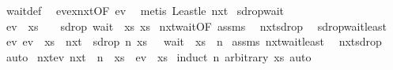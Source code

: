 \begin{isabellebody}
%
\isadelimproof
%
\endisadelimproof
%
\isatagproof
{}\isamarkupfalse%
\ wait{\isacharunderscore}def\ \isamarkupfalse%
\ ev{\isacharunderscore}ex{\isacharunderscore}nxt{\isacharbrackleft}OF\ ev{\isacharbrackright}\ \isamarkupfalse%
\ {\isacharparenleft}metis\ Least{\isacharunderscore}le\ nxt{\isacharparenright}%
\endisatagproof
{\isafoldproof}%
%
\isadelimproof
\isanewline
%
\endisadelimproof
\isanewline
{}\isamarkupfalse%
\ sdrop{\isacharunderscore}wait{\isacharcolon}\isanewline
{}\ {\isachardoublequoteopen}ev\ {\isasymphi}\ xs{\isachardoublequoteclose}\ \ \ {\isachardoublequoteopen}{\isasymphi}\ {\isacharparenleft}sdrop\ {\isacharparenleft}wait\ {\isasymphi}\ xs{\isacharparenright}\ xs{\isacharparenright}{\isachardoublequoteclose}\isanewline
%
\isadelimproof
%
\endisadelimproof
%
\isatagproof
{}\isamarkupfalse%
\ nxt{\isacharunderscore}wait{\isacharbrackleft}OF\ assms{\isacharbrackright}\ \isamarkupfalse%
\ nxt{\isacharunderscore}sdrop\ \isacommand{{\isachardot}}\isamarkupfalse%
%
\endisatagproof
{\isafoldproof}%
%
\isadelimproof
\isanewline
%
\endisadelimproof
\isanewline
{}\isamarkupfalse%
\ sdrop{\isacharunderscore}wait{\isacharunderscore}least{\isacharcolon}\isanewline
{}\ ev{\isacharcolon}\ {\isachardoublequoteopen}ev\ {\isasymphi}\ xs{\isachardoublequoteclose}\ \ nxt{\isacharcolon}\ {\isachardoublequoteopen}{\isasymphi}\ {\isacharparenleft}sdrop\ n\ xs{\isacharparenright}{\isachardoublequoteclose}\ \ \ {\isachardoublequoteopen}wait\ {\isasymphi}\ xs\ {\isasymle}\ n{\isachardoublequoteclose}\isanewline
%
\isadelimproof
%
\endisadelimproof
%
\isatagproof
{}\isamarkupfalse%
\ assms\ nxt{\isacharunderscore}wait{\isacharunderscore}least\ \isamarkupfalse%
\ nxt{\isacharunderscore}sdrop\ \isamarkupfalse%
\ auto%
\endisatagproof
{\isafoldproof}%
%
\isadelimproof
\isanewline
%
\endisadelimproof
\isanewline
{}\isamarkupfalse%
\ nxt{\isacharunderscore}ev{\isacharcolon}\ {\isachardoublequoteopen}{\isacharparenleft}nxt\ {\isacharcircum}{\isacharcircum}\ n{\isacharparenright}\ {\isasymphi}\ xs\ {\isasymLongrightarrow}\ ev\ {\isasymphi}\ xs{\isachardoublequoteclose}\isanewline
%
\isadelimproof
%
\endisadelimproof
%
\isatagproof
{}\isamarkupfalse%
\ {\isacharparenleft}induct\ n\ arbitrary{\isacharcolon}\ xs{\isacharparenright}\ auto%
\endisatagproof
{\isafoldproof}%
%
\isadelimproof

\end{isabellebody}
